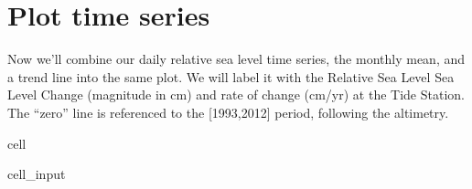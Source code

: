 \documentclass[letterpaper,10pt,english]{jupyterBook}
\begin{document}
\chapter{Plot time series}
\label{\detokenize{notebooks/regional_and_local/SL_Trend:rsltimeseries}}\label{\detokenize{notebooks/regional_and_local/SL_Trend:id2}}
\sphinxAtStartPar
Now we’ll combine our daily relative sea level time series, the monthly mean, and a trend line into the same plot. We will label it with the Relative Sea Level Sea Level Change (magnitude in cm) and rate of change (cm/yr) at the Tide Station. The “zero” line is referenced to the {[}1993,2012{]} period, following the altimetry.

\begin{sphinxuseclass}{cell}\begin{sphinxVerbatimInput}

\begin{sphinxuseclass}{cell_input}
\begin{sphinxVerbatim}[commandchars=\\\{\}]
  


  

   


\end{sphinxVerbatim}
\end{sphinxuseclass}
\end{sphinxVerbatimInput}
\end{sphinxuseclass}
\end{document}

